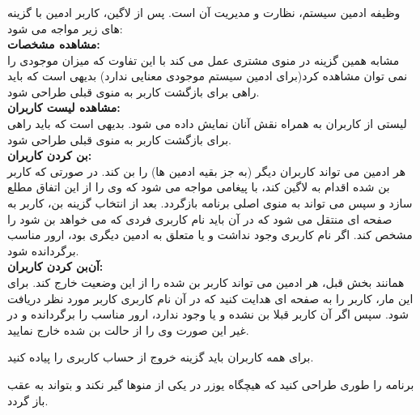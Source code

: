 \documentclass{article}
\begin{document}
    \subsubsection{}
    وظیفه ادمین سیستم، نظارت و مدیریت آن است. پس از لاگین، کاربر 
    ادمین با گزینه های زیر مواجه می شود:
    \vspace{0.5cm}
    \\ \textbf{مشاهده مشخصات:} \\    
    مشابه همین گزینه در منوی مشتری عمل می کند با این تفاوت که 
    میزان موجودی را نمی توان مشاهده کرد(برای ادمین سیستم موجودی معنایی ندارد)
    بدیهی است که باید راهی برای بازگشت کاربر به منوی قبلی طراحی شود.
    \vspace{0.5cm}
    \\ \textbf{مشاهده لیست کاربران:} \\    
    لیستی از کاربران به همراه نقش آنان نمایش داده می شود.
    بدیهی است که باید راهی برای بازگشت کاربر به منوی قبلی طراحی شود.
    \vspace{0.5cm}
    \\ \textbf{بن کردن کاربران:} \\    
    هر ادمین می تواند کاربران دیگر (به جز بقیه ادمین ها) را بن 
    کند. در صورتی که کاربر بن شده اقدام به لاگین کند، با پیغامی 
    مواجه می شود که وی را از این اتفاق مطلع سازد و سپس می تواند 
    به منوی اصلی برنامه بازگردد.
    بعد از انتخاب گزینه بن، کاربر به صفحه ای منتقل می شود
    که در آن باید نام کاربری فردی که می خواهد بن شود را مشخص کند.
    اگر نام کاربری وجود نداشت و یا متعلق به ادمین دیگری بود، ارور مناسب
    برگردانده شود.
    \vspace{0.5cm}
    \\ \textbf{آن‌بن کردن کاربران:} \\
    همانند بخش قبل، هر ادمین می تواند کاربر بن شده را از این وضعیت 
    خارج کند. برای این مار، کاربر را به صفحه ای هدایت کنید که در آن 
    نام کاربری کاربر مورد نظر دریافت شود. سپس اگر آن کاربر قبلا
    بن نشده و یا وجود ندارد، ارور مناسب را برگردانده و در غیر 
    این صورت وی را از حالت بن شده خارج نمایید.
    
    \vspace{1cm}

    \begin{tcolorbox}[colback=caribbeangreen!5!white,colframe=caribbeangreen!75!black,title=\textbf{نکته یک}]
        برای همه کاربران باید گزینه خروج از حساب کاربری را پیاده کنید.
    \end{tcolorbox}

    \begin{tcolorbox}[colback=caribbeangreen!5!white,colframe=caribbeangreen!75!black,title=\textbf{نکته دو}]
        برنامه را طوری طراحی کنید که هیچگاه یوزر در یکی از منوها گیر 
        نکند و بتواند به عقب باز گردد.
    \end{tcolorbox}
\end{document}
